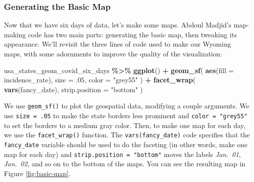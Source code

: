 \documentclass[
]{book}
\newenvironment{Shaded}{\begin{snugshade}}{\end{snugshade}}
\newcommand{\AttributeTok}[1]{\textcolor[rgb]{0.13,0.29,0.53}{#1}}
\newcommand{\DecValTok}[1]{\textcolor[rgb]{0.00,0.00,0.81}{#1}}
\newcommand{\FunctionTok}[1]{\textcolor[rgb]{0.13,0.29,0.53}{\textbf{#1}}}
\newcommand{\NormalTok}[1]{#1}
\newcommand{\SpecialCharTok}[1]{\textcolor[rgb]{0.81,0.36,0.00}{\textbf{#1}}}
\newcommand{\StringTok}[1]{\textcolor[rgb]{0.31,0.60,0.02}{#1}}
\begin{document}
\hypertarget{generating-the-basic-map}{%
\subsubsection*{Generating the Basic Map}\label{generating-the-basic-map}}

Now that we have six days of data, let's make some maps. Abdoul Madjid's map-making code has two main parts: generating the basic map, then tweaking its appearance. We'll revisit the three lines of code used to make our Wyoming maps, with some adornments to improve the quality of the visualization:

\begin{Shaded}
\begin{Highlighting}[]
\NormalTok{usa\_states\_geom\_covid\_six\_days }\SpecialCharTok{\%\textgreater{}\%}
  \FunctionTok{ggplot}\NormalTok{() }\SpecialCharTok{+}
  \FunctionTok{geom\_sf}\NormalTok{(}
    \FunctionTok{aes}\NormalTok{(}\AttributeTok{fill =}\NormalTok{ incidence\_rate),}
    \AttributeTok{size =}\NormalTok{ .}\DecValTok{05}\NormalTok{,}
    \AttributeTok{color =} \StringTok{"grey55"}
\NormalTok{  ) }\SpecialCharTok{+}
  \FunctionTok{facet\_wrap}\NormalTok{(}
    \FunctionTok{vars}\NormalTok{(fancy\_date),}
    \AttributeTok{strip.position =} \StringTok{"bottom"}
\NormalTok{  )}
\end{Highlighting}
\end{Shaded}

We use \texttt{geom\_sf()} to plot the geospatial data, modifying a couple arguments. We use \texttt{size\ =\ .05} to make the state borders less prominent and \texttt{color\ =\ "grey55"} to set the borders to a medium gray color. Then, to make one map for each day, we use the \texttt{facet\_wrap()} function. The \texttt{vars(fancy\_date)} code specifies that the \texttt{fancy\_date} variable should be used to do the faceting (in other words, make one map for each day) and \texttt{strip.position\ =\ "bottom"} moves the labels \emph{Jan.~01}, \emph{Jan.~02}, and so on to the bottom of the maps. You can see the resulting map in Figure \ref{fig:basic-map}.
\end{document}
